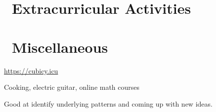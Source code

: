 \documentclass{resume}
\begin{document}
\section{\faInfo\ Extracurricular Activities}


\section{\faInfo\ Miscellaneous}
\begin{description}[itemsep=0.5ex]
  \item[Personal Blog] \url{https://cubicy.icu}
  \item[Hobbies] Cooking, electric guitar, online math courses
  \item[self description] Good at identify underlying patterns and coming up with new ideas.
\end{description}
\end{document}
